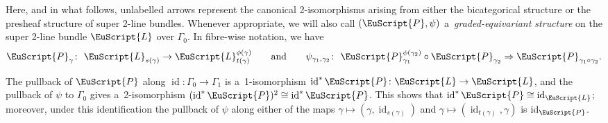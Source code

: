 \documentclass[pdftex]{sigma}
\numberwithin{equation}{section}
\def\mathscr#1{\EuScript{#1}}
\newcommand{\id}{\operatorname{id}}
\def\quand{\qquad\text{and}\qquad}
\begin{document}
Here, and in what follows, unlabelled arrows represent the canonical 2-isomorphisms arising from either the bicategorical structure or the presheaf structure of super 2-line bundles.
Whenever appropriate, we will also call $(\mathscr{P},\psi)$ a~\emph{graded-equivariant structure} on the super 2-line bundle $\mathscr{L}$ over $\Gamma_0$. In fibre-wise notation, we have
\begin{equation*}
 \mathscr{P}_\gamma\colon\ \mathscr{L}_{s(\gamma)} \to \mathscr{L}_{t(\gamma)}^{\phi(\gamma)}
\quand
 \psi_{\gamma_1,\gamma_2} \colon \ \mathscr{P}_{\gamma_1}^{\phi(\gamma_2)} \circ \mathscr{P}_{\gamma_2} \Rightarrow \mathscr{P}_{\gamma_1 \circ \gamma_2}.
\end{equation*}




\begin{Remark}
\label{normalized graded-equivariant structures}
The pullback of $\mathscr{P}$ along $\id\colon \Gamma_0 \to \Gamma_1$ is a~1-isomorphism $\id^{*}\mathscr{P}\colon \mathscr{L} \to \mathscr{L}$, and the pullback of $\psi$ to $\Gamma_0$ gives a~2-isomorphism $(\id^{*}\mathscr{P})^2 \cong \id^{*}\mathscr{P}$. This shows that $\id^{*}\mathscr{P}\cong \id_{\mathscr{L}}$; moreover, under this identification the pullback of $\psi$ along either of the maps $\gamma \mapsto (\gamma,\id_{s(\gamma)})$ and $\gamma \mapsto (\id_{t(\gamma)},\gamma)$ is $\id_{\mathscr{P}}$.
\end{Remark}
\end{document}
